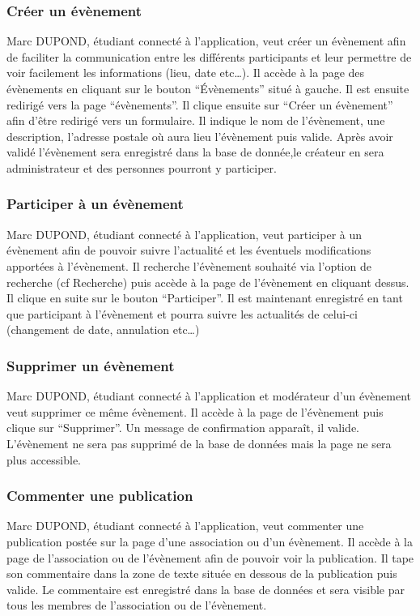 \subsubsection*{Créer un évènement}
Marc DUPOND, étudiant connecté à l’application, veut créer un évènement afin de faciliter la communication entre les différents participants et leur permettre de voir facilement les informations (lieu, date etc…). Il accède à la page des évènements en cliquant sur le bouton “Évènements” situé à gauche. Il est ensuite redirigé vers la page “évènements”. Il clique ensuite sur “Créer un évènement” afin d’être redirigé vers un formulaire. Il indique le nom de l'évènement, une description, l’adresse postale où aura lieu l’évènement puis valide. Après avoir validé l’évènement sera enregistré dans la base de donnée,le créateur en sera administrateur et des personnes pourront y participer.
\subsubsection*{Participer à  un évènement}
Marc DUPOND, étudiant connecté à l’application, veut participer à  un évènement afin de pouvoir suivre l’actualité et les éventuels modifications apportées à l'évènement. Il recherche l'évènement souhaité via l’option de recherche (cf Recherche) puis accède à la page de l'évènement en cliquant dessus. Il clique en suite sur le bouton “Participer”. Il est maintenant enregistré en tant que participant à l'évènement et pourra suivre les actualités de celui-ci (changement de date, annulation etc…)
\subsubsection*{Supprimer un évènement}
Marc DUPOND, étudiant connecté à l’application et modérateur d’un évènement veut supprimer ce même évènement. Il accède à la page de l’évènement puis clique sur “Supprimer”. Un message de confirmation apparaît, il valide. L’évènement ne sera pas supprimé de la base de données mais la page ne sera plus accessible.
\subsubsection*{Commenter une publication}
Marc DUPOND, étudiant connecté à l’application, veut commenter une publication postée sur la page d’une association ou d’un évènement. Il accède à la page de l’association ou de l’évènement afin de pouvoir voir la publication. Il tape son commentaire dans la zone de texte située en dessous de la publication puis valide. Le commentaire est enregistré dans la base de données et sera visible par tous les membres de l’association ou de l’évènement.
